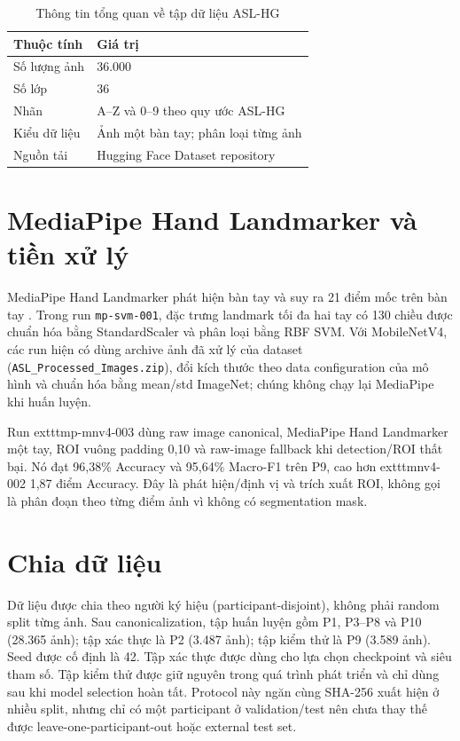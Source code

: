 \begin{table}[ht]
\centering
\caption{Thông tin tổng quan về tập dữ liệu ASL-HG}
\label{tab:dataset-overview}
\begin{tabular}{ll}
\toprule
Thuộc tính & Giá trị\\
\midrule
Số lượng ảnh & 36.000\\
Số lớp & 36\\
Nhãn & A--Z và 0--9 theo quy ước ASL-HG\\
Kiểu dữ liệu & Ảnh một bàn tay; phân loại từng ảnh\\
Nguồn tải & Hugging Face Dataset repository\\
\bottomrule
\end{tabular}
\end{table}

\section{MediaPipe Hand Landmarker và tiền xử lý}
MediaPipe Hand Landmarker phát hiện bàn tay và suy ra 21 điểm mốc trên bàn tay \cite{mediapipe}. Trong run \texttt{mp-svm-001}, đặc trưng landmark tối đa hai tay có 130 chiều được chuẩn hóa bằng StandardScaler và phân loại bằng RBF SVM. Với MobileNetV4, các run hiện có dùng archive ảnh đã xử lý của dataset (\texttt{ASL\_Processed\_Images.zip}), đổi kích thước theo data configuration của mô hình và chuẩn hóa bằng mean/std ImageNet; chúng không chạy lại MediaPipe khi huấn luyện.

Run 	exttt{mp-mnv4-003} dùng raw image canonical, MediaPipe Hand Landmarker một tay, ROI vuông padding 0,10 và raw-image fallback khi detection/ROI thất bại. Nó đạt 96,38\% Accuracy và 95,64\% Macro-F1 trên P9, cao hơn 	exttt{mnv4-002} 1,87 điểm Accuracy. Đây là phát hiện/định vị và trích xuất ROI, không gọi là phân đoạn theo từng điểm ảnh vì không có segmentation mask.

\section{Chia dữ liệu}
Dữ liệu được chia theo người ký hiệu (participant-disjoint), không phải random split từng ảnh. Sau canonicalization, tập huấn luyện gồm P1, P3--P8 và P10 (28.365 ảnh); tập xác thực là P2 (3.487 ảnh); tập kiểm thử là P9 (3.589 ảnh). Seed được cố định là 42. Tập xác thực được dùng cho lựa chọn checkpoint và siêu tham số. Tập kiểm thử được giữ nguyên trong quá trình phát triển và chỉ dùng sau khi model selection hoàn tất. Protocol này ngăn cùng SHA-256 xuất hiện ở nhiều split, nhưng chỉ có một participant ở validation/test nên chưa thay thế được leave-one-participant-out hoặc external test set.

